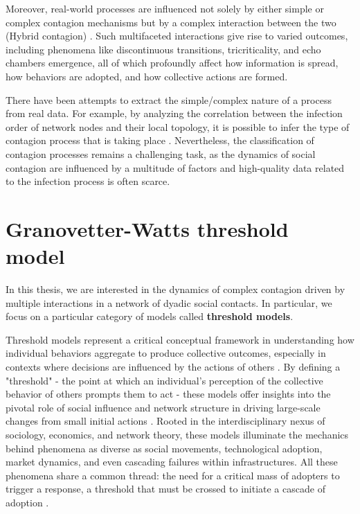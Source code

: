 Moreover, real-world processes are influenced not solely by either simple or complex contagion mechanisms but by a complex interaction between the two (Hybrid contagion) \cite{min-2018,diaz-diaz-2022}. Such multifaceted interactions give rise to varied outcomes, including phenomena like discontinuous transitions, tricriticality, and echo chambers emergence, all of which profoundly affect how information is spread, how behaviors are adopted, and how collective actions are formed.

There have been attempts to extract the simple/complex nature of a process from real data. For example, by analyzing the correlation between the infection order of network nodes and their local topology, it is possible to infer the type of contagion process that is taking place \cite{cencetti-2023}. Nevertheless, the classification of contagion processes remains a challenging task, as the dynamics of social contagion are influenced by a multitude of factors and high-quality data related to the infection process is often scarce.

\section{\label{sec:Granovetter-Watts threshold model} Granovetter-Watts threshold model}

In this thesis, we are interested in the dynamics of complex contagion driven by multiple interactions in a network of dyadic social contacts. In particular, we focus on a particular category of models called \textbf{threshold models}.

Threshold models represent a critical conceptual framework in understanding how individual behaviors aggregate to produce collective outcomes, especially in contexts where decisions are influenced by the actions of others \cite{granovetter-1973,granovetter-1978}. By defining a "threshold" - the point at which an individual's perception of the collective behavior of others prompts them to act - these models offer insights into the pivotal role of social influence and network structure in driving large-scale changes from small initial actions \cite{dodds-2004}. Rooted in the interdisciplinary nexus of sociology, economics, and network theory, these models illuminate the mechanics behind phenomena as diverse as social movements, technological adoption, market dynamics, and even cascading failures within infrastructures. All these phenomena share a common thread: the need for a critical mass of adopters to trigger a response, a threshold that must be crossed to initiate a cascade of adoption \cite{centola-2007,centola-2010}.

